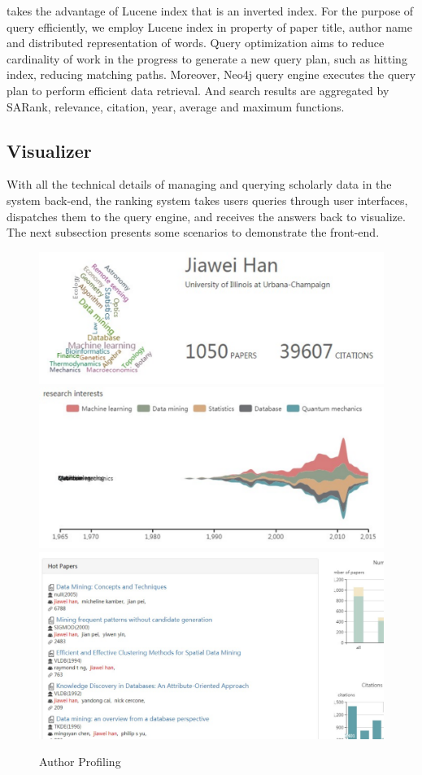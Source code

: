 \par
\oursystem takes the advantage of Lucene index that is an inverted index. For the purpose of query efficiently, we employ Lucene index in property of paper title, author name and distributed representation of words. Query optimization aims to reduce cardinality of work in the progress to generate a new query plan, such as hitting index, reducing matching paths. Moreover, Neo4j query engine executes the query plan to perform efficient data retrieval. And search results are aggregated by SARank, relevance, citation, year, average and maximum functions.

\subsection{Visualizer}
With all the technical details of managing and querying scholarly data in the system back-end, the ranking system takes users queries through user interfaces, dispatches them to the query engine, and receives the answers back to visualize. The next subsection presents some scenarios to demonstrate the front-end.

\begin{figure}
\centering
\includegraphics[width=\columnwidth]{hjwAvatar.pdf}
\includegraphics[width=\columnwidth]{hjwInterest.pdf}
\includegraphics[width=\columnwidth]{hjwPapers.pdf}
\caption{Author Profiling}
\label{fig:hjwProfile}
\vspace{-3ex}
\end{figure}



